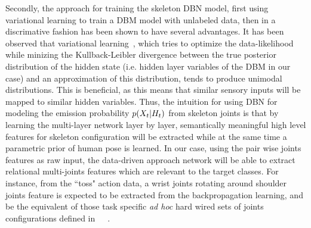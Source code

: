 Secondly, the approach for training the skeleton DBN model, first using variational learning to train a
 DBM model with unlabeled data, then in a discrimative fashion
\cite{salakhutdinov2009learning} has been shown to have several advantages.
%
It has been observed that  variational learning~\cite{neal1998view}, 
which tries to optimize the data-likelihood while minizing the Kullback-Leibler divergence between 
the true posterior distribution of the hidden state (i.e. hidden layer variables of the DBM  in our case) 
and an approximation of this distribution, tends to produce unimodal distributions.
%
This is beneficial, as this means that similar sensory inputs will be mapped to  similar hidden variables.
%
Thus, the intuition for using DBN  for modeling the emission probability $p(X_t|H_t)$  
from skeleton joints  is that by learning the multi-layer network layer by layer, 
semantically meaningful high level features for skeleton configuration will be extracted while at the same 
time a  parametric prior of human pose is learned.
%
%
In our case, using the pair wise joints features as raw input, the data-driven approach network will be able to extract relational 
multi-joints features which are relevant to the target classes. 
For instance, from  the ``toss" action data, a wrist joints rotating around shoulder joints feature is expected to 
be extracted from the backpropagation  learning, and be the equivalent of those task specific \emph{ad hoc} hard wired sets 
of joints configurations defined in~\cite{chaudhry2013bio}~\cite{muller2006motion}\cite{nowozin2012action}~\cite{ofli2013sequence}.

